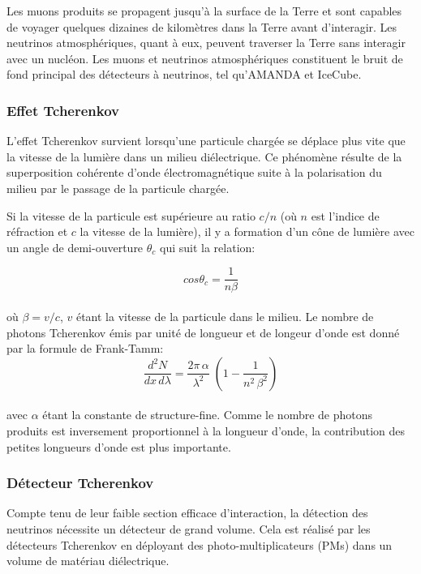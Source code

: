 Les muons produits se propagent jusqu'à la surface de la Terre et sont capables de voyager quelques dizaines de kilomètres dans la Terre avant d'interagir. Les neutrinos atmosphériques, quant à eux, peuvent traverser la Terre sans interagir avec un nucléon. Les muons et neutrinos atmosphériques constituent le bruit de fond principal des détecteurs à neutrinos, tel qu'AMANDA et IceCube.

\subsubsection{Effet Tcherenkov}

L'effet Tcherenkov survient lorsqu'une particule chargée se déplace plus vite que la vitesse de la lumière dans un milieu diélectrique. Ce phénomène résulte de la superposition cohérente d'onde électromagnétique suite à la polarisation du milieu par le passage de la particule chargée.

Si la vitesse de la particule est supérieure au ratio $c/n$ (où $n$ est l'indice de réfraction et $c$ la vitesse de la lumière), il y a formation d'un cône de lumière avec un angle de demi-ouverture $\theta_c$ qui suit la relation:

\begin{equation}
    cos\theta_c = \frac{1}{n\beta}
\end{equation}\\

où $\beta = v/c$, $v$ étant la vitesse de la particule dans le milieu. Le nombre de photons Tcherenkov émis par unité de longueur et de longeur d'onde est donné par la formule de Frank-Tamm: \\

\begin{equation}
     \frac{d^2N}{dx \, d\lambda} = \frac{2\pi \, \alpha}{\lambda^2} \; (1- \frac{1}{n^2 \, \beta^2} )
\end{equation}\\

avec $\alpha$ étant la constante de structure-fine. Comme le nombre de photons produits est inversement proportionnel à la longueur d'onde, la contribution des petites longueurs d'onde est plus importante.

\subsubsection{Détecteur Tcherenkov}

Compte tenu de leur faible section efficace d'interaction, la détection des neutrinos nécessite un détecteur de grand volume. Cela est réalisé par les détecteurs Tcherenkov en déployant des photo-multiplicateurs (PMs) dans un volume de matériau diélectrique.\\

